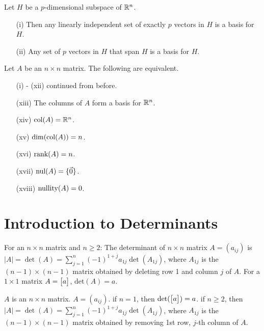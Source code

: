 \documentclass[10pt,a4paper]{article}
\begin{document}
\begin{theorem}
	Let $H$ be a $p$-dimensional subspace of $\mathbb{R}^n$. 
	\begin{enumerate}
	\item[(i)] Then any linearly independent set of exactly $p$ vectors in $H$ is a basis for $H$. 
	\item[(ii)] Any set of $p$ vectors in $H$ that span $H$ is a basis for $H$.
	\end{enumerate}
\end{theorem}

\begin{theorem}
	Let $A$ be an $n\times n$ matrix. The following are equivalent.
	\begin{enumerate}
		\item[(i)]- (xii) continued from before.
		\item[(xiii)] The columns of $A$ form a basis for $\mathbb{R}^n$. 
		\item[(xiv)] $\text{col}(A) = \mathbb{R}^n$. 
		\item[(xv)] $\dim(\text{col}(A)) = n$. 
		\item[(xvi)] $\text{rank}(A) = n$. 
		\item[(xvii)] $\text{nul}(A) = \{\vec{0}\}$. 
		\item[(xviii)] $\text{nullity}(A) = 0$.
	\end{enumerate}
\end{theorem}

\section{Introduction to Determinants}

\begin{definition}
	For an $n\times n$ matrix and $n\geq 2$: The determinant of $n\times n$ matrix $A = (a_{ij})$ is $|A| = \det(A) = \sum_{j=1}^n (-1)^{1+j} a_{1j} \det(A_{1j})$, where $A_{1j}$ is the $(n-1)\times (n-1)$ matrix obtained by deleting row 1 and column $j$ of $A$.
	For a $1\times 1$ matrix $A=\begin{bmatrix}a\end{bmatrix}$, $\text{det}(A) = a$.
\end{definition}

\begin{recall}[Determinants]
	$A$ is an $n\times n$ matrix. $A = (a_{ij})$. if $n=1$, then $\det(\begin{bmatrix}a\end{bmatrix}) = a$. if $n\geq 2$, then $|A| = \det(A) = \sum_{j=1}^n (-1)^{1+j} a_{1j} \det(A_{1j})$, where $A_{1j}$ is the $(n-1)\times (n-1)$ matrix obtained by removing 1st row, $j$-th column of $A$.
\end{recall}
\end{document}
